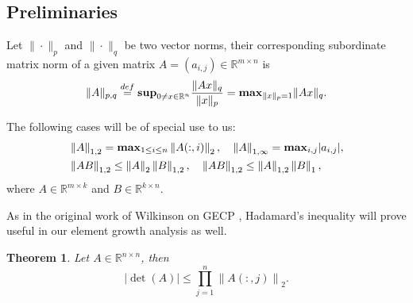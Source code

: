 \documentclass[11pt]{article}
\newtheorem{theorem}{Theorem}[section]
\begin{document}
\subsection{Preliminaries}
Let $\| \cdot \|_p$ and $\| \cdot \|_q$ be two vector norms, their corresponding subordinate matrix norm of a given matrix $A  = \left(a_{i,j}\right) \in \mathbb{R}^{m \times n}$ is  \cite{higham2002accuracy,horn2012matrix}
$$
\| A \|_{p, q} \stackrel{def}{=} {\bf sup}_{0 \neq x \in \mathbb{R}^n} \frac{ \| Ax \|_q }{ \| x \|_p } = {\bf max}_{ \| x \|_p = 1} \| Ax \|_q.
$$

The following cases \cite{higham2002accuracy} will be of special use to us:
\begin{align*}
    &\left\| A \right\|_{1, 2}  = {\bf max}_{1 \le i \le n} \left\| A(:,i) \right\|_2, \quad \left\| A \right\|_{1, \infty} = {\bf max}_{i, j} | a_{i, j } |, \\
    &\left\|AB\right\|_{1,2} \le \left\|A\right\|_2 \left\|B\right\|_{1,2}, \quad 
\left\|AB\right\|_{1,2} \le \left\|A\right\|_{1,2} \left\|B\right\|_1,
\end{align*}
where $A \in \mathbb{R}^{m \times k}$ and $B \in \mathbb{R}^{k \times n}$.

As in the original work of Wilkinson on GECP \cite{wilkinson1961error}, Hadamard's inequality \cite{horn2012matrix} will prove useful in our element growth analysis as well. 
\begin{theorem}\label{Th:Hadamard Inequality} Let $A \in \mathbb{R}^{n \times n}$, then 
$$
\left| \det(A) \right| \le \prod_{j = 1}^n \left\| A(:, j) \right\|_2.
$$
\end{theorem}
\end{document}
